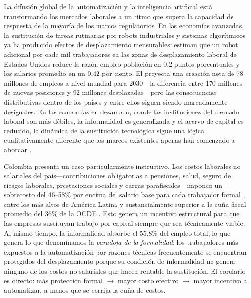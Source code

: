 \documentclass{article}
\begin{document}
La difusi\'on global de la automatizaci\'on y la inteligencia artificial est\'a transformando los mercados laborales a un ritmo que supera la capacidad de respuesta de la mayor\'ia de los marcos regulatorios. En las econom\'ias avanzadas, la sustituci\'on de tareas rutinarias por robots industriales y sistemas algor\'itmicos ya ha producido efectos de desplazamiento mensurables: \cite{acemoglu2020robots} estiman que un robot adicional por cada mil trabajadores en las zonas de desplazamiento laboral de Estados Unidos reduce la raz\'on empleo-poblaci\'on en 0,2 puntos porcentuales y los salarios promedio en un 0,42 por ciento. El \cite{wef2025} proyecta una creaci\'on neta de 78 millones de empleos a nivel mundial para 2030---la diferencia entre 170 millones de nuevas posiciones y 92 millones desplazadas---pero las consecuencias distributivas dentro de los pa\'ises y entre ellos siguen siendo marcadamente desiguales. En las econom\'ias en desarrollo, donde las instituciones del mercado laboral son m\'as d\'ebiles, la informalidad es generalizada y el acervo de capital es reducido, la din\'amica de la sustituci\'on tecnol\'ogica sigue una l\'ogica cualitativamente diferente que los marcos existentes apenas han comenzado a abordar \cite{bid2023, maloney2016}.

Colombia presenta un caso particularmente instructivo. Los costos laborales no salariales del pa\'is---contribuciones obligatorias a pensiones, salud, seguro de riesgos laborales, prestaciones sociales y cargas parafiscales---imponen un sobrecosto del 46--58\% por encima del salario base para cada trabajador formal \cite{anif2018}, entre los m\'as altos de Am\'erica Latina y sustancialmente superior a la cu\~na fiscal promedio del 36\% de la OCDE \cite{oecd2025voces}. Esto genera un incentivo estructural para que las empresas sustituyan trabajo por capital siempre que sea t\'ecnicamente viable. Al mismo tiempo, la informalidad absorbe el 55,8\% del empleo total, lo que genera lo que denominamos la \textit{paradoja de la formalidad}: los trabajadores m\'as expuestos a la automatizaci\'on por razones t\'ecnicas frecuentemente se encuentran protegidos del desplazamiento porque su condici\'on de informalidad no genera ninguno de los costos no salariales que hacen rentable la sustituci\'on. El corolario es directo: m\'as protecci\'on formal $\rightarrow$ mayor costo efectivo $\rightarrow$ mayor incentivo a automatizar, a menos que se corrija la cu\~na de costos.
\end{document}
